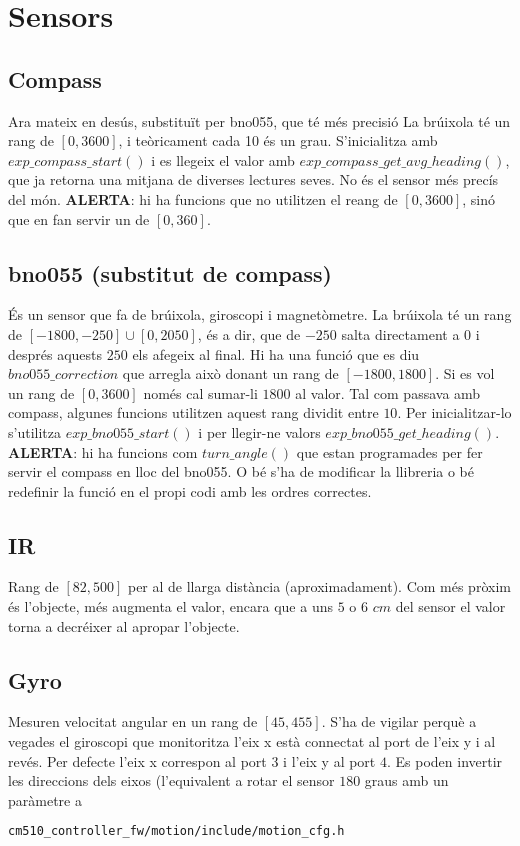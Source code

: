 \documentclass{article}
\begin{document}
\section{Sensors}
\subsection{Compass} Ara mateix en desús, substituït per bno055, que té més precisió La brúixola té un rang de $[0, 3600]$, i teòricament cada 10 és un grau. S'inicialitza amb $exp\_compass\_start()$ i es llegeix el valor amb $exp\_compass\_get\_avg\_heading()$, que ja retorna una mitjana de diverses lectures seves. No és el sensor més precís del món. \textbf{ALERTA}: hi ha funcions que no utilitzen el reang de $[0, 3600]$, sinó que en fan servir un de $[0, 360]$.
\subsection{bno055 (substitut de compass)}
És un sensor que fa de brúixola, giroscopi i magnetòmetre. La brúixola té un rang de $[-1800, -250]\cup [0, 2050]$, és a dir, que de $-250$ salta directament a $0$ i després aquests $250$ els afegeix al final. Hi ha una funció que es diu $bno055\_correction$ que arregla això donant un rang de $[-1800, 1800]$. Si es vol un rang de $[0, 3600]$ només cal sumar-li $1800$ al valor. Tal com passava amb compass, algunes funcions utilitzen aquest rang dividit entre $10$. Per inicialitzar-lo s'utilitza $exp\_bno055\_start()$ i per llegir-ne valors $exp\_bno055\_get\_heading()$. \textbf{ALERTA}: hi ha funcions com $turn\_angle()$ que estan programades per fer servir el compass en lloc del bno055. O bé s'ha de modificar la llibreria o bé redefinir la funció en el propi codi amb les ordres correctes.

\subsection{IR}
Rang de $[82, 500]$ per al de llarga distància (aproximadament). Com més pròxim és l'objecte, més augmenta el valor, encara que a uns $5$ o $6$ $cm$ del sensor el valor torna a decréixer al apropar l'objecte.

\subsection{Gyro} 
Mesuren velocitat angular en un rang de $[45, 455]$. S'ha de vigilar perquè a vegades el giroscopi que monitoritza l'eix x està connectat al port de l'eix y i al revés. Per defecte l'eix x correspon al port $3$ i l'eix y al port $4$. Es poden invertir les direccions dels eixos (l'equivalent a rotar el sensor $180$ graus amb un paràmetre a 
\begin{lstlisting}[language=bash]
cm510_controller_fw/motion/include/motion_cfg.h
\end{lstlisting}
\end{document}

